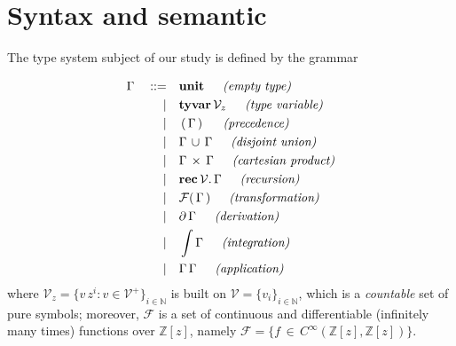 \section{Syntax and semantic}

The type system subject of our study is defined by the grammar
\begin{definition}[Syntax]
\begin{displaymath}
\begin{split}
\Gamma\quad::=\quad&\tyunit\indent\textit{(empty type)} \\
             |\quad&\textbf{tyvar}\,\mathcal{V}_{z}\indent\textit{(type variable)} \\
             |\quad&\typarens{\Gamma}\indent\textit{(precedence)} \\
             |\quad&\tydu{\Gamma}{\Gamma}\indent\textit{(disjoint union)} \\
             |\quad&\tycp{\Gamma}{\Gamma}\indent\textit{(cartesian product)} \\
             |\quad&\textbf{rec}\,\mathcal{V}.\,\Gamma\indent\textit{(recursion)} \\
             |\quad&\mathcal{F}(\,\Gamma\,)\indent\textit{(transformation)} \\
             |\quad&\partial\,{\Gamma}\indent\textit{(derivation)} \\
             |\quad&\int{\Gamma}\indent\textit{(integration)} \\
             |\quad&\Gamma\,\Gamma\indent\textit{(application)} \\
\end{split}
\end{displaymath}
where $\mathcal{V}_{z} = \lbrace v\,z^{i}:v\in\mathcal{V}^{+}
\rbrace_{i\in\mathbb{N}}$ is built on $\mathcal{V}=  \lbrace v_{i}
\rbrace_{i\in\mathbb{N}}$, which is a \textit{countable} set of pure symbols;
moreover, $\mathcal{F}$ is a set of continuous and differentiable (infinitely
many times) functions over $\mathbb{Z}[z]$, namely  $\mathcal{F} = \lbrace
f\,\in\,C^{\infty}(\mathbb{Z}[z], \mathbb{Z}[z])\rbrace$.
\end{definition}

